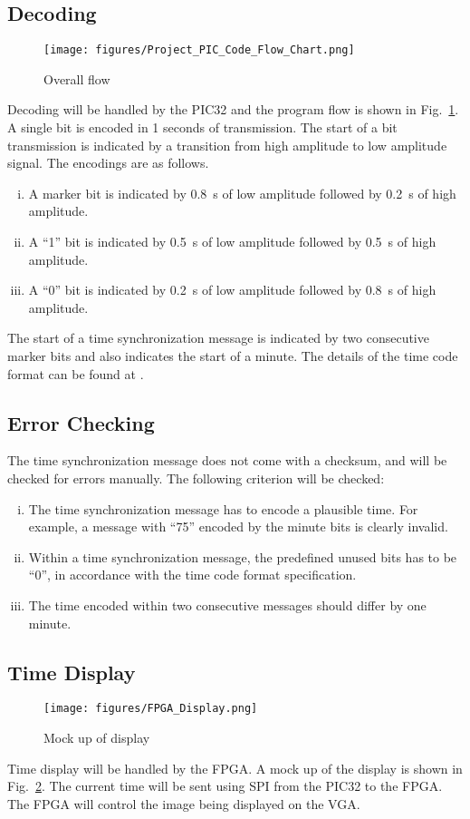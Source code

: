 \documentclass[11pt]{article}
\begin{document}
\subsection{Decoding}
\begin{figure}[h]
  \centering
  \texttt{[image: figures/Project\_PIC\_Code\_Flow\_Chart.png]}
  \caption{Overall flow}
  \label{fig:flow}
\end{figure}
Decoding will be handled by the PIC32 and the program flow is shown in
Fig.~\ref{fig:flow}. A single bit is encoded in 1 seconds of transmission. The start of a
bit transmission is indicated by a transition from high amplitude to low amplitude signal.
The encodings are as follows.
\begin{enumerate}[i.]
  \item
    A marker bit is indicated by \SI{0.8}{\second} of low amplitude followed by
    \SI{0.2}{\second} of high amplitude.
  \item
    A ``1'' bit is indicated by \SI{0.5}{\second} of low amplitude followed by
    \SI{0.5}{\second} of high amplitude.
  \item
    A ``0'' bit is indicated by \SI{0.2}{\second} of low amplitude followed by
    \SI{0.8}{\second} of high amplitude.
\end{enumerate}
The start of a time synchronization message is indicated by two consecutive marker bits
and also indicates the start of a minute. The details of the time code format can be found
at \cite{wiki}.

\subsection{Error Checking}
The time synchronization message does not come with a checksum, and will be checked for
errors manually. The following criterion will be checked:
\begin{enumerate}[i.]
  \item
    The time synchronization message has to encode a plausible time. For example,
    a message with ``75'' encoded by the minute bits is clearly invalid.
  \item
    Within a time synchronization message, the predefined unused bits has to be ``0'', in
    accordance with the time code format specification.
  \item
    The time encoded within two consecutive messages should differ by one minute.
\end{enumerate}

\subsection{Time Display}
\begin{figure}[h]
  \centering
  \texttt{[image: figures/FPGA\_Display.png]}
  \caption{Mock up of display}
  \label{fig:display}
\end{figure}
Time display will be handled by the FPGA. A mock up of the display is shown in
Fig.~\ref{fig:display}. The current time will be sent using SPI from the
PIC32 to the FPGA. The FPGA will control the image being displayed on the VGA.
\end{document}
